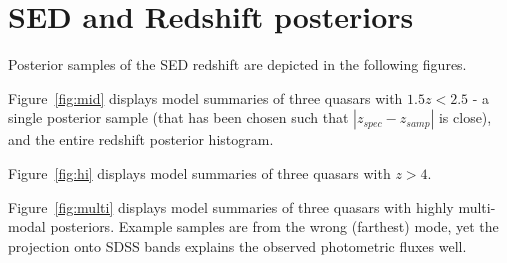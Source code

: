 \documentclass{article}
\begin{document}
 


\section{SED and Redshift posteriors}
Posterior samples of the SED redshift are depicted in the following figures. 

Figure~\ref{fig:mid} displays model summaries of three quasars with $1.5 z < 2.5$ - a single posterior sample (that has been chosen such that $|z_{spec} - z_{samp}|$ is close), and the entire redshift posterior histogram.  

Figure~\ref{fig:hi} displays model summaries of three quasars with $z > 4$. 

Figure~\ref{fig:multi} displays model summaries of three quasars with highly multi-modal posteriors.  Example samples are from the wrong (farthest) mode, yet the projection onto SDSS bands explains the observed photometric fluxes well. 
\end{document}
